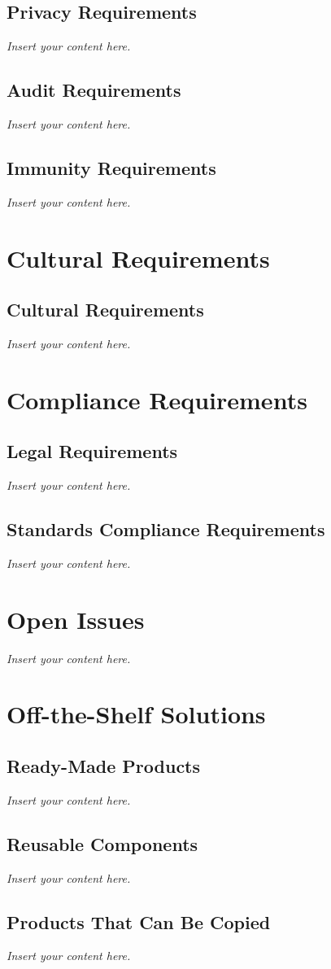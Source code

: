 \documentclass[12pt]{article}
\newcommand{\lips}{\textit{Insert your content here.}}
\begin{document}
\subsection{Privacy Requirements}
\lips
\subsection{Audit Requirements}
\lips
\subsection{Immunity Requirements}
\lips

\section{Cultural Requirements}
\subsection{Cultural Requirements}
\lips

\section{Compliance Requirements}
\subsection{Legal Requirements}
\lips
\subsection{Standards Compliance Requirements}
\lips

\section{Open Issues}
\lips

\section{Off-the-Shelf Solutions}
\subsection{Ready-Made Products}
\lips
\subsection{Reusable Components}
\lips
\subsection{Products That Can Be Copied}
\lips
\end{document}
